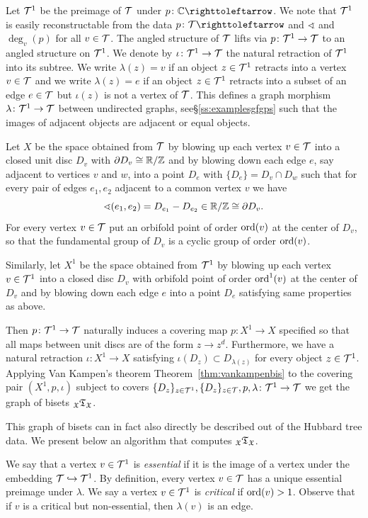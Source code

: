 \documentclass{amsart}
\begin{document}
Let ${\mathcal T}^1$ be the preimage of ${\mathcal T}$ under $p\colon\C\selfmap$. We
note that ${\mathcal T}^1$ is easily reconstructable from the data
$p\colon\HT\selfmap$ and $\sphericalangle$ and $\deg_v(p)$ for all
$v\in {\mathcal T}$. The angled structure of ${\mathcal T}$ lifts via
$p\colon {\mathcal T}^1\to{\mathcal T}$ to an angled structure on ${\mathcal T}^1$. We denote by
$\iota\colon{\mathcal T}^1\to{\mathcal T}$ the natural retraction of ${\mathcal T}^1$ into its
subtree. We write $\lambda(z)=v$ if an object $z\in {\mathcal T}^1$ retracts
into a vertex $v\in {\mathcal T}$ and we write $\lambda(z)=e$ if an object
$z\in {\mathcal T}^1$ retracts into a subset of an edge $e\in {\mathcal T}$ but
$\iota(z)$ is not a vertex of ${\mathcal T}$. This defines a graph morphism
$\lambda\colon {\mathcal T}^1\to{\mathcal T}$ between undirected graphs,
see\S\ref{ss:examplesgfgps} such that the images of adjacent objects
are adjacent or equal objects.

Let $X$ be the space obtained from ${\mathcal T}$ by blowing up each vertex $v\in
{\mathcal T}$ into a closed unit disc $D_v$ with $\partial D_v\cong {\mathbb R}/{\mathbb Z}$ and by
blowing down each edge $e$, say adjacent to vertices $v$ and $w$, into a
point $D_e$ with $\{D_e\}=D_v\cap D_w$ such that for every pair of edges
$e_1,e_2$ adjacent to a common vertex $v$ we have
\[\sphericalangle(e_1,e_2)=D_{e_1}-D_{e_2}\in {\mathbb R}/{\mathbb Z} \cong \partial D_v .\]
For every vertex $v\in {\mathcal T}$ put an orbifold point of order $\operatorname{ord}(v)$ at the
center of $D_v$, so that the fundamental group of $D_v$ is a cyclic group
of order $\operatorname{ord}(v)$.

Similarly, let $X^1$ be the space obtained from ${\mathcal T}^1$ by blowing up each
vertex $v\in {\mathcal T}^1$ into a closed disc $D_v$ with orbifold point of order
$\operatorname{ord}^1(v)$ at the center of $D_v$ and by blowing down each edge $e$ into a
point $D_e$ satisfying same properties as above.

Then $p\colon{\mathcal T}^1\to{\mathcal T}$ naturally induces a covering map $p\colon X^1\to
X$ specified so that all maps between unit discs are of the form $z\to
z^d$. Furthermore, we have a natural retraction $\iota\colon X^1\to X$
satisfying $\iota(D_z)\subset D_{\lambda(z)}$ for every object $z\in
{\mathcal T}^1$. Applying Van Kampen's theorem Theorem~\ref{thm:vankampenbis} to the
covering pair $(X^1,p, \iota)$ subject to covers $\{D_z\}_{z\in {\mathcal T}^1},
\{D_z\}_{z\in {\mathcal T}}, p, \lambda\colon {\mathcal T}^1\to{\mathcal T}$ we get the graph of
bisets ${}_{\mathfrak X}{\mathfrak T}_{{\mathfrak X}}$.

This graph of bisets can in fact also directly be described out of the
Hubbard tree data. We present below an algorithm that computes
${}_{\mathfrak X}{\mathfrak T}_{{\mathfrak X}}$.

We say that a vertex $v\in {\mathcal T}^1$ is \emph{essential} if it is the image of
a vertex under the embedding ${\mathcal T}\hookrightarrow {\mathcal T}^1$. By definition,
every vertex $v\in {\mathcal T}$ has a unique essential preimage under $\lambda$. We
say a vertex $v\in {\mathcal T}^1$ is \emph{critical} if $\operatorname{ord}(v)>1$. Observe that
if $v$ is a critical but non-essential, then $\lambda(v)$ is an edge.
\end{document}
